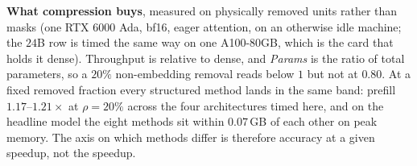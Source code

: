 \begin{table}[t]
\centering\small
\caption{\textbf{What compression buys}, measured on physically removed units rather than masks
(one RTX 6000 Ada, bf16, eager attention, on an otherwise idle machine; the $24$B row is
timed the same way on one A100-80GB, which is the card that holds it dense). Throughput is relative to
dense, and \emph{Params} is the ratio of total parameters, so a $20\%$ non-embedding removal reads
below $1$ but not at $0.80$. At a fixed removed fraction every structured method lands in the same
band: prefill $1.17$--$1.21\times$ at $\rho{=}20\%$ across the four architectures timed here, and on
the headline model the eight methods sit within $0.07$\,GB of each other on peak memory. The axis on
which methods differ is therefore accuracy at a given speedup, not the speedup.}
\label{tab:efficiency}
\end{table}
